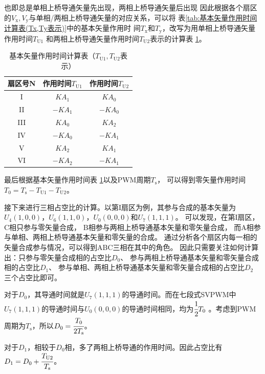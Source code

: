 也即总是单相上桥导通矢量先出现，两相上桥导通矢量后出现
因此根据各个扇区的\(V_{\mathrm{x}},V_{\mathrm{y}}\)与单相/两相上桥导通矢量的对应关系，可以将
表\ref{tab:基本矢量作用时间计算表(Tx,Ty表示)}中的基本矢量作用时
间\(T_{\mathrm{x}}\)和\(T_{\mathrm{y}}\)，改写为用单相上桥导通矢量作用时间\(T_{\mathrm{U1}}\)
和两相上桥导通矢量作用时间\(T_{\mathrm{U2}}\)表示的计算表
\ref{tab:基本矢量作用时间计算表(TU1,TU2表示)}。
\begin{table}[H]
    \centering
    \begin{tabular}{|c|c|c|}
        \hline
        扇区号N&作用时间\(T_{\mathrm{U1}}\)&作用时间\(T_{\mathrm{U2}}\)\\
        \hline
        I&\(KA_1\)&\(KA_0\)\\
        \hline
        II&\(-KA_1\)&\(-KA_0\)\\
        \hline
        III&\(KA_0\)&\(KA_2\)\\
        \hline
        IV&\(-KA_0\)&\(-KA_1\)\\
        \hline
        V&\(KA_2\)&\(KA_1\)\\
        \hline
        VI&\(-KA_2\)&\(-KA_1\)\\
        \hline
    \end{tabular}
    \caption{基本矢量作用时间计算表（\(T_{\mathrm{U1}},T_{\mathrm{U2}}\)表示）}
    \label{tab:基本矢量作用时间计算表(TU1,TU2表示)}
\end{table}

最后根据基本矢量作用时间表
\ref{tab:基本矢量作用时间计算表(TU1,TU2表示)}以及PWM周期\(T_{\mathrm{s}}\)，
可以得到零矢量作用时间\(T_0=T_{\mathrm{s}}-T_{\mathrm{U1}}-T_{\mathrm{U2}}\)。

接下来进行三相占空比的计算。以第I扇区为例，其参与合成的基本矢量为
\(U_4(1,0,0)\)，\(U_6(1,1,0)\)，\(U_0(0,0,0)\)和\(U_7(1,1,1)\)。
可以发现，在第I扇区，C相只参与零矢量合成，
B相参与两相上桥导通基本矢量和零矢量合成，
而A相参与单相、两相上桥导通基本矢量和零矢量的合成。
通过分析各个扇区内每一相的矢量合成参与情况，可以得到ABC三相在其中的角色。
因此只需要关注如何计算出：只参与零矢量合成相的占空比\(D_0\)、
参与两相上桥导通基本矢量和零矢量合成相的占空比\(D_1\)、
参与单相、两相上桥导通基本矢量和零矢量合成相的占空比\(D_2\)
三个占空比即可。

对于\(D_0\)，其导通时间就是\(U_7(1,1,1)\)的导通时间。而在七段式SVPWM中
\(U_7(1,1,1)\)的导通时间与\(U_0(0,0,0)\)的导通时间相同，均为\(\cfrac{1}{2}T_0\)
。考虑到PWM周期为\(T_{\mathrm{s}}\)，所以\(D_0=\cfrac{T_0}{2T_{\mathrm{s}}}\)。

对于\(D_1\)，相较于\(D_0\)相，多了两相上桥导通的作用时间。因此占空比有
\(D_1=D_0+\cfrac{T_{\mathrm{U2}}}{T_{\mathrm{s}}}\)。

